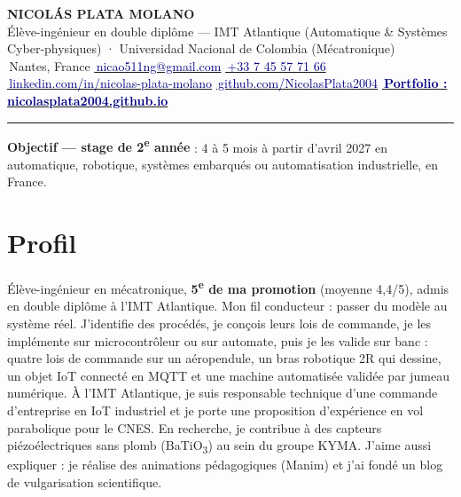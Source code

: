\documentclass[10pt,a4paper]{article}
\newcommand{\lien}[3]{\href{#2}{\textcolor{navy}{#1\,#3}}}
\newcommand{\info}[2]{\textcolor{grey}{#1}\,#2}
\newcommand{\bati}{BaTiO\textsubscript{3}}
\begin{document}
\thispagestyle{fancy}

\begin{center}
  {\LARGE\bfseries NICOLÁS PLATA MOLANO}\\[2pt]
  {\color{grey}Élève-ingénieur en double diplôme — IMT Atlantique (Automatique \& Systèmes Cyber-physiques) · Universidad Nacional de Colombia (Mécatronique)}\\[3pt]
  {\small \info{\faMapMarker*}{Nantes, France} \quad \lien{\faEnvelope}{mailto:nicao511ng@gmail.com}{nicao511ng@gmail.com} \quad \lien{\faPhone}{tel:+33745577166}{+33 7 45 57 71 66}}\\[2pt]
  {\small \lien{\faLinkedin}{https://www.linkedin.com/in/nicolas-plata-molano}{linkedin.com/in/nicolas-plata-molano} \quad \lien{\faGithub}{https://github.com/NicolasPlata2004}{github.com/NicolasPlata2004} \quad \lien{\faGlobe}{https://nicolasplata2004.github.io}{\textbf{Portfolio : nicolasplata2004.github.io}}}
\end{center}
\vspace{-4pt}
{\color{navy}\rule{\linewidth}{0.8pt}}
\vspace{3pt}

{\small\textbf{Objectif — stage de 2\textsuperscript{e} année} : 4 à 5 mois à partir d'avril 2027 en automatique,
robotique, systèmes embarqués ou automatisation industrielle, en France.}

\section{Profil}
{\small Élève-ingénieur en mécatronique, \textbf{5\textsuperscript{e} de ma promotion} (moyenne 4,4/5), admis en double diplôme à l'IMT Atlantique.
Mon fil conducteur : passer du modèle au système réel. J'identifie des procédés, je conçois leurs lois de commande, je les implémente sur
microcontrôleur ou sur automate, puis je les valide sur banc : quatre lois de commande sur un aéropendule, un bras robotique 2R qui dessine,
un objet IoT connecté en MQTT et une machine automatisée validée par jumeau numérique. À l'IMT Atlantique, je suis
responsable technique d'une commande d'entreprise en IoT industriel et je porte une proposition d'expérience en vol parabolique pour le CNES. En recherche, je contribue à des capteurs
piézoélectriques sans plomb (\bati) au sein du groupe KYMA. J'aime aussi expliquer : je réalise des animations pédagogiques (Manim)
et j'ai fondé un blog de vulgarisation scientifique.}
\end{document}
